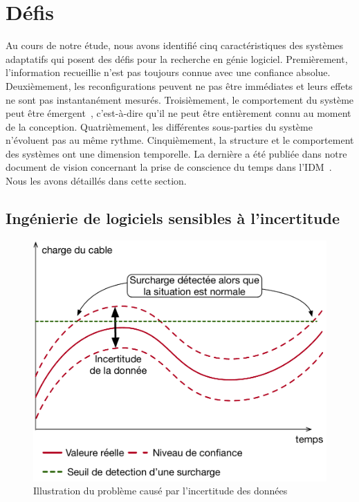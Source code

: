 \section{Défis}

%
Au cours de notre étude, nous avons identifié cinq caractéristiques des systèmes adaptatifs qui posent des défis pour la recherche en génie logiciel. 
Premièrement, l'information recueillie n'est pas toujours connue avec une confiance absolue. 
Deuxièmement, les reconfigurations peuvent ne pas être immédiates et leurs effets ne sont pas instantanément mesurés. 
Troisièmement, le comportement du système peut être émergent~\cite{zio2011uncertainties}, c'est-à-dire qu'il ne peut être entièrement connu au moment de la conception. 
Quatrièmement, les différentes sous-parties du système n'évoluent pas au même rythme. 
Cinquièmement, la structure et le comportement des systèmes ont une dimension temporelle. 
La dernière a été publiée dans notre document de vision concernant la prise de conscience du temps dans l'IDM~\cite{DBLP:conf/models/Benelallam0MFBB17}. 
Nous les avons détaillés dans cette section.

\subsection{Ingénierie de logiciels sensibles à l'incertitude}
\label{sec_french_challenges_duc}

\begin{figure}
	\centering
	\includegraphics[width=.6\linewidth]{img/apdx-french/challenges/duc}
	\caption{Illustration du problème causé par l'incertitude des données}
	\label{fig_french_chal_duc}
\end{figure}

